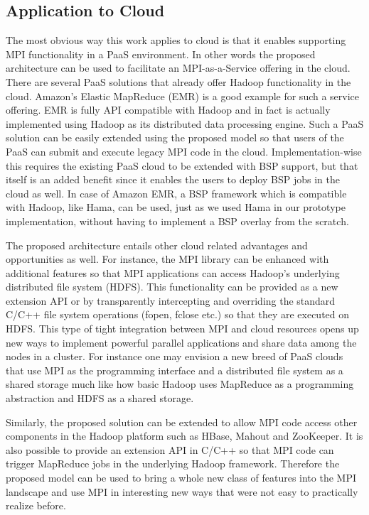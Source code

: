 \documentclass[conference,10pt] {IEEEtran}
\begin{document}
\subsection{Application to Cloud}
The most obvious way this work applies to cloud is that it enables supporting MPI functionality in a PaaS environment. In other words the proposed architecture can be used to facilitate an MPI-as-a-Service offering in the cloud. There are several PaaS solutions that already offer Hadoop functionality in the cloud. Amazon's Elastic MapReduce (EMR) is a good example for such a service offering. EMR is fully API compatible with Hadoop and in fact is actually implemented using Hadoop as its distributed data processing engine. Such a PaaS solution can be easily extended using the proposed model so that users of the PaaS can submit and execute legacy MPI code in the cloud. Implementation-wise this requires the existing PaaS cloud to be extended with BSP support, but that itself is an added benefit since it enables the users to deploy BSP jobs in the cloud as well. In case of Amazon EMR, a BSP framework which is compatible with Hadoop, like Hama, can be used, just as we used Hama in our prototype implementation, without having to implement a BSP overlay from the scratch.

The proposed architecture entails other cloud related advantages and opportunities as well. For instance, the MPI library can be enhanced with additional features so that MPI applications can access Hadoop's underlying distributed file system (HDFS). This functionality can be provided as a new extension API or by transparently intercepting and overriding the standard C/C++ file system operations (fopen, fclose etc.) so that they are executed on HDFS. This type of tight integration between MPI and cloud resources opens up new ways to implement powerful parallel applications and share data among the nodes in a cluster. For instance one may envision a new breed of PaaS clouds that use MPI as the programming interface and a distributed file system as a shared storage much like how basic Hadoop uses MapReduce as a programming abstraction and HDFS as a shared storage.

Similarly, the proposed solution can be extended to allow MPI code access other components in the Hadoop platform such as HBase, Mahout and ZooKeeper. It is also possible to provide an extension API in C/C++ so that MPI code can trigger MapReduce jobs in the underlying Hadoop framework. Therefore the proposed model can be used to bring a whole new class of features into the MPI landscape and use MPI in interesting new ways that were not easy to practically realize before. 
\end{document}
